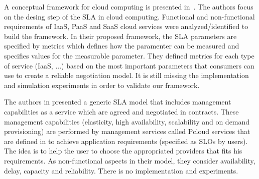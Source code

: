 \documentclass[12pt,a4paper,oneside]{book}
\begin{document}
\bigskip
A conceptual framework for cloud computing is presented in~\cite{005}. The authors focus on the desing step of the SLA in cloud computing. Functional and non-functional requirements of IaaS, PaaS and SaaS cloud services were analyzed/identified to build the framework. In their proposed framework, the SLA parameters are specified by metrics which defines how the paramenter can be measured and specifies values for the measurable parameter. They defined metrics for each type of service (IaaS, ...) based on the most important parameters that consumers can use to create a reliable negotiation model. It is still missing the implementation and simulation experiments in order to validate our framework.

\bigskip
The authors in \cite{009} presented a generic SLA model that includes management capabilities as a service which are agreed and negotiated in contracts. These management capabilities (elasticity, high availability, scalability and on demand provisioning) are performed by management services called Pcloud services that are defined in to achieve application requirements (specified as SLOs by users). The idea is to help the user to choose the appropriated providers that fits his requirements. As non-functional aspects in their model, they consider availability, delay, capacity and reliability. There is no implementation and experiments.



\end{document}
